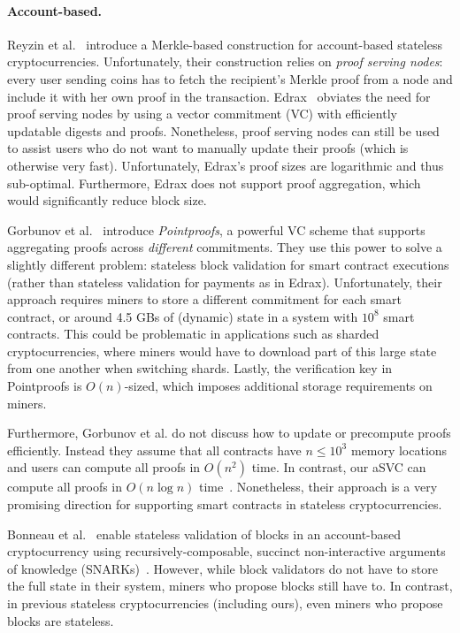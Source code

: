 \paragraph{Account-based.}
Reyzin et al.~\cite{RMCI17} introduce a Merkle-based construction for account-based stateless cryptocurrencies.
Unfortunately, their construction relies on \textit{proof serving nodes}: every user sending coins has to fetch the recipient's Merkle proof from a node and include it with her own proof in the transaction.
Edrax~\cite{CPZ18} obviates the need for proof serving nodes by using a vector commitment (VC) with efficiently updatable digests and proofs.
Nonetheless, proof serving nodes can still be used to assist users who do not want to manually update their proofs (which is otherwise very fast).
Unfortunately, Edrax's proof sizes are logarithmic and thus sub-optimal.
Furthermore, Edrax does not support proof aggregation, which would significantly reduce block size.

Gorbunov et al.~\cite{GRWZ20} introduce \textit{Pointproofs}, a powerful VC scheme that supports aggregating proofs across \textit{different} commitments.
They use this power to solve a slightly different problem: stateless block validation for smart contract executions (rather than stateless validation for payments as in Edrax).
Unfortunately, their approach requires miners to store a different commitment for each smart contract, or around 4.5 GBs of (dynamic) state in a system with $10^8$ smart contracts.
This could be problematic in applications such as sharded cryptocurrencies, where miners would have to download part of this large state from one another when switching shards.
Lastly, the verification key in Pointproofs is $O(n)$-sized, which imposes additional storage requirements on miners.

Furthermore, Gorbunov et al. do not discuss how to update or precompute proofs efficiently.
Instead they assume that all contracts have $n\le 10^3$ memory locations and users can compute all proofs in $O(n^2)$ time.
In contrast, our aSVC can compute all proofs in $O(n\log{n})$ time~\cite{FK20}.
Nonetheless, their approach is a very promising direction for supporting smart contracts in stateless cryptocurrencies.

Bonneau et al.~\cite{BMRS20} enable stateless validation of blocks in an account-based cryptocurrency using recursively-composable, succinct non-interactive arguments of knowledge (SNARKs)~\cite{BCTV14}.
However, while block validators do not have to store the full state in their system, miners who propose blocks still have to.
In contrast, in previous stateless cryptocurrencies (including ours), even miners who propose blocks are stateless.